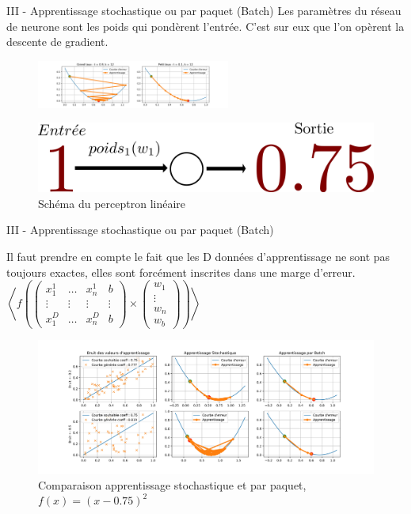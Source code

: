 \documentclass[10pt]{beamer}
\begin{document}
\begin{frame}{III - Apprentissage stochastique ou par paquet (Batch)}
Les paramètres du réseau de neurone sont les poids qui pondèrent l'entrée. C'est sur eux que l'on opèrent la descente de gradient. 
\begin{figure}
	\centering
    \includegraphics[height=60px]{1-DescenteGradient.jpg}
\end{figure}
\begin{figure}
	\centering
    \includegraphics[width=\textwidth]{6-Perceptron.png}
	\caption{Schéma du perceptron linéaire}
\end{figure}
\end{frame}

\begin{frame}{III - Apprentissage stochastique ou par paquet (Batch)}
\begin{multicols}{2}
Il faut prendre en compte le fait que les D données d'apprentissage ne sont pas toujours exactes, elles sont forcément inscrites dans une marge d'erreur. 
\columnbreak
$
\left< f
\left(
\begin{pmatrix}
x_1^{1} & \ldots & x_n^{1} & b \\
\vdots & \vdots & \vdots & \vdots \\
x_1^{D} & \ldots & x_n^{D} & b
\end{pmatrix}
\times
\begin{pmatrix}
w_1 \\
\vdots \\
w_n \\
w_b
\end{pmatrix}
\right) \right>
$
\end{multicols}
\begin{figure}
	\centering
    \includegraphics[width=\textwidth, trim=0 30 0 30, clip]{7-Batch.jpg}
	\caption{Comparaison apprentissage stochastique et par paquet, $f(x) = (x-0.75)^2$}
\end{figure}
\end{frame}
\end{document}

